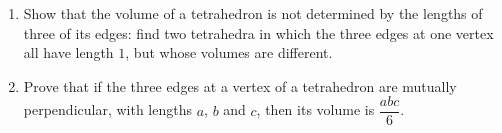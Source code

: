 \begin{enumerate}
\item[(a)] Show that the volume of a tetrahedron is not determined by the lengths of three of its edges: find two tetrahedra in which the three edges at one vertex all have length $1$, but whose volumes are different.
\item[(b)] Prove that if the three edges at a vertex of a tetrahedron are mutually perpendicular, with lengths $a$, $b$ and $c$, then its volume is $\dfrac{abc}{6}$.
\end{enumerate}
